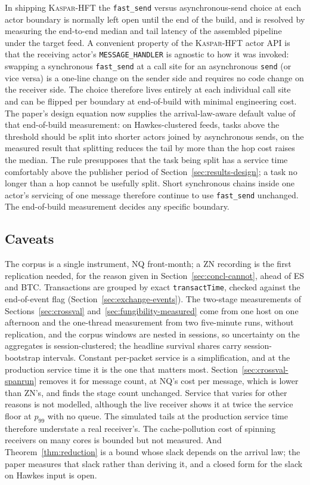 \documentclass[11pt]{article}
\newcommand{\kasparhft}{\textsc{Kaspar-HFT}}
\begin{document}
In shipping \kasparhft{} the \texttt{fast\_send} versus asynchronous-send choice at each
actor boundary is normally left open until the end of the build, and is resolved by
measuring the end-to-end median and tail latency of the assembled pipeline under the
target feed. A convenient property of the \kasparhft{} actor API is that the receiving
actor's \texttt{MESSAGE\_HANDLER} is agnostic to how it was invoked: swapping a synchronous
\texttt{fast\_send} at a call site for an asynchronous \texttt{send} (or vice versa) is a
one-line change on the sender side and requires no code change on the receiver side. The
choice therefore lives entirely at each individual call site and can be flipped per
boundary at end-of-build with minimal engineering cost. The paper's design equation now
supplies the arrival-law-aware default value of that end-of-build measurement: on
Hawkes-clustered feeds, tasks above the threshold should be split into shorter actors
joined by asynchronous sends, on the measured result that splitting reduces the tail by
more than the hop cost raises the median. The rule presupposes that the task being split
has a service time comfortably above the publisher period of
Section~\ref{sec:results-design}; a task no longer than a hop cannot be usefully split.
Short synchronous chains inside one actor's servicing of one message therefore continue
to use \texttt{fast\_send} unchanged. The end-of-build measurement decides any specific
boundary.

\subsection{Caveats}
\label{sec:concl-caveats}

The corpus is a single instrument, NQ front-month; a ZN recording is the first
replication needed, for the reason given in Section~\ref{sec:concl-cannot}, ahead of ES
and BTC. Transactions are grouped by exact \texttt{transactTime}, checked against the
end-of-event flag (Section~\ref{sec:exchange-events}). The two-stage measurements of
Sections~\ref{sec:crossval} and~\ref{sec:fungibility-measured} come from one host on one
afternoon and the one-thread measurement from two five-minute runs, without replication, and the corpus windows are nested in sessions, so
uncertainty on the aggregates is session-clustered; the headline survival shares carry
session-bootstrap intervals. Constant per-packet service is a simplification, and at the
production service time it is the one that matters most.
Section~\ref{sec:crossval-spanrun} removes it for message count, at NQ's cost per
message, which is lower than ZN's, and finds the stage count unchanged. Service that
varies for other reasons is not modelled, although the live receiver shows it at twice
the service floor at $p_{99}$ with no queue. The simulated tails at the production service
time therefore understate a real receiver's. The cache-pollution cost of spinning receivers on many cores is bounded
but not measured. And Theorem~\ref{thm:reduction} is a bound whose slack depends on the
arrival law; the paper measures that slack rather than deriving it, and a closed form for
the slack on Hawkes input is open.
\end{document}
